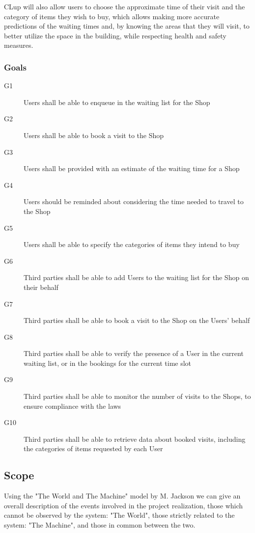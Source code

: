 CLup will also allow users to choose the approximate time of their visit and the category of items they wish to buy, which allows making more accurate predictions of the waiting times and, by knowing the areas that they will visit, to better utilize the space in the building, while respecting health and safety measures.

\subsubsection{Goals}

\begin{description}
    \item [G1]  Users shall be able to enqueue in the waiting list for the Shop
    \item [G2]  Users shall be able to book a visit to the Shop
    \item [G3]  Users shall be provided with an estimate of the waiting time for a Shop
    \item [G4]  Users should be reminded about considering the time needed to travel to the Shop
    \item [G5]  Users shall be able to specify the categories of items they intend to buy 
    
    \item [G6]  Third parties shall be able to add Users to the waiting list for the Shop on their behalf
    \item [G7]  Third parties shall be able to book a visit to the Shop on the Users' behalf
    \item [G8]  Third parties shall be able to verify the presence of a User in the current waiting list, or in the bookings for the current time slot
    \item [G9]  Third parties shall be able to monitor the number of visits to the Shops, to ensure compliance with the laws
    \item [G10] Third parties shall be able to retrieve data about booked visits, including the categories of items requested by each User 
    
\end{description}
\subsection{Scope}

Using the "The World and The Machine" model by M. Jackson we can give an overall description of the events involved in the project realization, those which cannot be observed by the system: "The World", those strictly related to the system: "The Machine", and those in common between the two.

